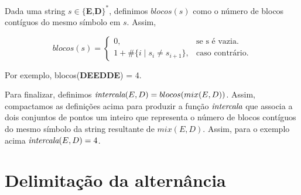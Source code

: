 Dada uma string $s \in \{$\textbf{E},\textbf{D}$\}^{*}$, definimos $blocos(s)$ como o número de blocos contíguos do mesmo símbolo em $s$. Assim,

\[
blocos(s) = 
\begin{cases}
    0, & \text{se s é vazia}. \\
    1 + \#\{i \mid s_i \neq s_{i+1}\}, & \text{caso contrário}.
\end{cases}
\]

Por exemplo, blocos(\textbf{DEEDDE}) = 4.

Para finalizar, definimos $\emph{intercala}(E,D) = blocos(mix(E,D))$. Assim, compactamos as definições acima para produzir a função $\emph{intercala}$ que associa a dois conjuntos de pontos um inteiro que representa o número de blocos contíguos do mesmo símbolo da string resultante de $mix(E,D)$. Assim, para o exemplo acima $\emph{intercala}(E,D) = 4$.


\section{Delimitação da alternância}

